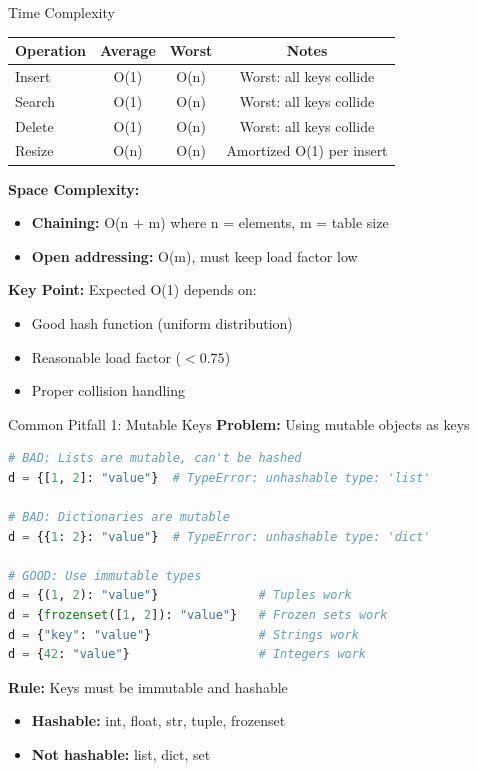 \documentclass[aspectratio=169]{beamer}
\begin{document}
\begin{frame}{Time Complexity}
  \begin{table}
    \centering
    \begin{tabular}{|l|c|c|c|}
      \hline
      \textbf{Operation} & \textbf{Average} & \textbf{Worst} & \textbf{Notes} \\
      \hline
      Insert & O(1) & O(n) & Worst: all keys collide \\
      \hline
      Search & O(1) & O(n) & Worst: all keys collide \\
      \hline
      Delete & O(1) & O(n) & Worst: all keys collide \\
      \hline
      Resize & O(n) & O(n) & Amortized O(1) per insert \\
      \hline
    \end{tabular}
  \end{table}

  \vspace{0.5cm}
  \textbf{Space Complexity:}
  \begin{itemize}
    \item \textbf{Chaining:} O(n + m) where n = elements, m = table size
    \item \textbf{Open addressing:} O(m), must keep load factor low
  \end{itemize}

  \vspace{0.3cm}
  \textbf{Key Point:} Expected O(1) depends on:
  \begin{itemize}
    \item Good hash function (uniform distribution)
    \item Reasonable load factor ($< 0.75$)
    \item Proper collision handling
  \end{itemize}
\end{frame}

\begin{frame}[fragile]{Common Pitfall 1: Mutable Keys}
  \textbf{Problem:} Using mutable objects as keys

  \begin{lstlisting}[language=Python, basicstyle=\ttfamily\small]
# BAD: Lists are mutable, can't be hashed
d = {[1, 2]: "value"}  # TypeError: unhashable type: 'list'

# BAD: Dictionaries are mutable
d = {{1: 2}: "value"}  # TypeError: unhashable type: 'dict'

# GOOD: Use immutable types
d = {(1, 2): "value"}              # Tuples work
d = {frozenset([1, 2]): "value"}   # Frozen sets work
d = {"key": "value"}               # Strings work
d = {42: "value"}                  # Integers work
  \end{lstlisting}

  \vspace{0.3cm}
  \textbf{Rule:} Keys must be immutable and hashable
  \begin{itemize}
    \item \textbf{Hashable:} int, float, str, tuple, frozenset
    \item \textbf{Not hashable:} list, dict, set
  \end{itemize}
\end{frame}
\end{document}
